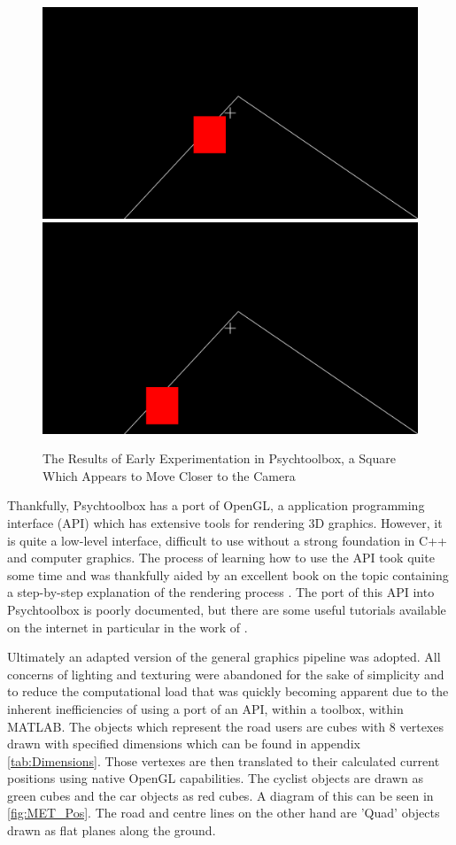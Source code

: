 \begin{figure}[H]
    \centering
    \includegraphics[width=0.45\linewidth]{figures/Slide1.png} \hfill
    \includegraphics[width=0.45\linewidth]{figures/Slide2.png}
    \caption{The Results of Early Experimentation in Psychtoolbox, a Square Which Appears to Move Closer to the Camera}
    \label{fig:EarlyPsychExp}
\end{figure}

Thankfully, Psychtoolbox has a port of OpenGL, a application programming interface (API) which has extensive tools for rendering 3D graphics. However, it is quite a low-level interface, difficult to use without a strong foundation in C++ and computer graphics. The process of learning how to use the API took quite some time and was thankfully aided by an excellent book on the topic containing a step-by-step explanation of the rendering process \citep{vriesLearnOpenGLGraphics2020a}. The port of this API into Psychtoolbox is poorly documented, but there are some useful tutorials available on the internet in particular in the work of \citet{scarfeVisionHapticsLaboratory2023}.

Ultimately an adapted version of the general graphics pipeline was adopted. All concerns of lighting and texturing were abandoned for the sake of simplicity and to reduce the computational load that was quickly becoming apparent due to the inherent inefficiencies of using a port of an API, within a toolbox, within MATLAB. The objects which represent the road users are cubes with 8 vertexes drawn with specified dimensions which can be found in appendix \ref{tab:Dimensions}. Those vertexes are then translated to their calculated current positions using native OpenGL capabilities. The cyclist objects are drawn as green cubes and the car objects as red cubes. A diagram of this can be seen in \ref{fig:MET_Pos}. The road and centre lines on the other hand are 'Quad' objects drawn as flat planes along the ground.

